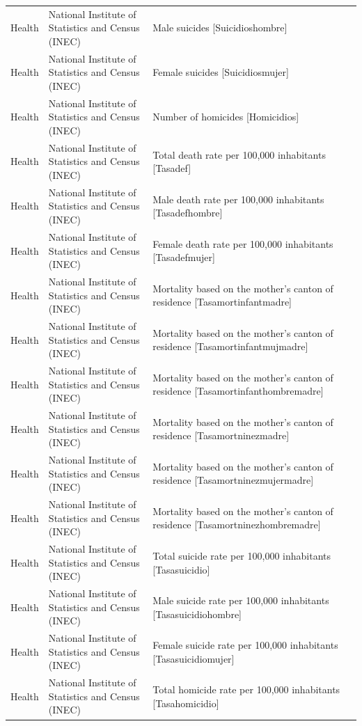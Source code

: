 \documentclass[10pt,a4paper]{article}
\begin{document}
\begin{longtable}{@{}>{\raggedright\arraybackslash}p{3.5cm}>{\raggedright\arraybackslash}p{5.6cm}>{\raggedright\arraybackslash}p{\dimexpr\textwidth-9.1cm-4\tabcolsep\relax}@{}}
Health & National Institute of Statistics and Census (INEC) & Male suicides [Suicidioshombre]\\
Health & National Institute of Statistics and Census (INEC) & Female suicides [Suicidiosmujer]\\
Health & National Institute of Statistics and Census (INEC) & Number of homicides [Homicidios]\\
Health & National Institute of Statistics and Census (INEC) & Total death rate per 100,000 inhabitants [Tasadef]\\
Health & National Institute of Statistics and Census (INEC) & Male death rate per 100,000 inhabitants [Tasadefhombre]\\
Health & National Institute of Statistics and Census (INEC) & Female death rate per 100,000 inhabitants [Tasadefmujer]\\
Health & National Institute of Statistics and Census (INEC) & Mortality based on the mother's canton of residence [Tasamortinfantmadre]\\
Health & National Institute of Statistics and Census (INEC) & Mortality based on the mother's canton of residence [Tasamortinfantmujmadre]\\
Health & National Institute of Statistics and Census (INEC) & Mortality based on the mother's canton of residence [Tasamortinfanthombremadre]\\
Health & National Institute of Statistics and Census (INEC) & Mortality based on the mother's canton of residence [Tasamortninezmadre]\\
Health & National Institute of Statistics and Census (INEC) & Mortality based on the mother's canton of residence [Tasamortninezmujermadre]\\
Health & National Institute of Statistics and Census (INEC) & Mortality based on the mother's canton of residence [Tasamortninezhombremadre]\\
Health & National Institute of Statistics and Census (INEC) & Total suicide rate per 100,000 inhabitants [Tasasuicidio]\\
Health & National Institute of Statistics and Census (INEC) & Male suicide rate per 100,000 inhabitants [Tasasuicidiohombre]\\
Health & National Institute of Statistics and Census (INEC) & Female suicide rate per 100,000 inhabitants [Tasasuicidiomujer]\\
Health & National Institute of Statistics and Census (INEC) & Total homicide rate per 100,000 inhabitants [Tasahomicidio]\\

\end{longtable}
\end{document}
